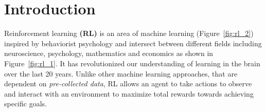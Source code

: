 
\chapter{Introduction}\label{chapter:introduction}

Reinforcement learning \textbf{(RL)} is an area of machine learning (Figure~\ref{fig:rl_2}) inspired by behaviorist psychology and intersect between different fields including neuroscience, psychology, mathematics and economics as shown in Figure~\ref{fig:rl_1}. It has revolutionized our understanding of learning in the brain over the last 20 years. Unlike other machine learning approaches, that are dependent on \textit{pre-collected data}, RL allows an agent to take actions to observe and interact with an environment to maximize total rewards towards achieving specific goals.

